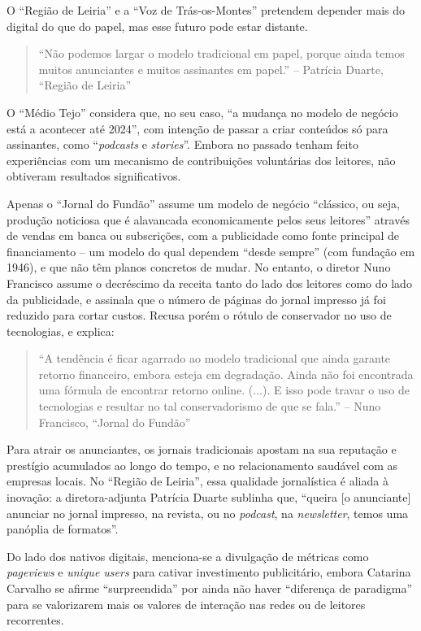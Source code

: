 \documentclass[portuguese]{textolivre}
\begin{document}
O ``Região de Leiria'' e a ``Voz de Trás-os-Montes'' pretendem depender
mais do digital do que do papel, mas esse futuro pode estar distante.

\begin{quote}
``Não podemos largar o modelo tradicional em papel, porque ainda temos
muitos anunciantes e muitos assinantes em papel.'' -- Patrícia Duarte,
``Região de Leiria''
\end{quote}

O ``Médio Tejo'' considera que, no seu caso, ``a mudança no modelo de
negócio está a acontecer até 2024'', com intenção de passar a criar
conteúdos só para assinantes, como ``\emph{podcasts} e \emph{stories}''.
Embora no passado tenham feito experiências com um mecanismo de
contribuições voluntárias dos leitores, não obtiveram resultados
significativos.

Apenas o ``Jornal do Fundão'' assume um modelo de negócio ``clássico, ou
seja, produção noticiosa que é alavancada economicamente pelos seus
leitores'' através de vendas em banca ou subscrições, com a publicidade
como fonte principal de financiamento -- um modelo do qual dependem
``desde sempre'' (com fundação em 1946), e que não têm planos concretos
de mudar. No entanto, o diretor Nuno Francisco assume o decréscimo da
receita tanto do lado dos leitores como do lado da publicidade, e
assinala que o número de páginas do jornal impresso já foi reduzido para
cortar custos. Recusa porém o rótulo de conservador no uso de
tecnologias, e explica:

\begin{quote}
``A tendência é ficar agarrado ao modelo tradicional que ainda garante
retorno financeiro, embora esteja em degradação. Ainda não foi
encontrada uma fórmula de encontrar retorno online. (...). E isso pode
travar o uso de tecnologias e resultar no tal conservadorismo de que se
fala.'' -- Nuno Francisco, ``Jornal do Fundão''
\end{quote}

Para atrair os anunciantes, os jornais tradicionais apostam na sua
reputação e prestígio acumulados ao longo do tempo, e no relacionamento
saudável com as empresas locais. No ``Região de Leiria'', essa qualidade
jornalística é aliada à inovação: a diretora-adjunta Patrícia Duarte
sublinha que, ``queira {[}o anunciante{]} anunciar no jornal impresso,
na revista, ou no \emph{podcast}, na \emph{newsletter}, temos uma
panóplia de formatos''.

Do lado dos nativos digitais, menciona-se a divulgação de métricas como
\emph{pageviews} e \emph{unique users} para cativar investimento
publicitário, embora Catarina Carvalho se afirme ``surpreendida'' por
ainda não haver ``diferença de paradigma'' para se valorizarem mais os
valores de interação nas redes ou de leitores recorrentes.
\end{document}
